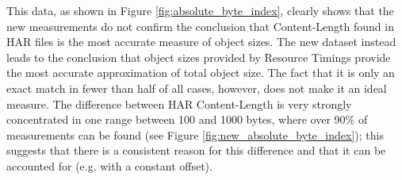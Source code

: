 This data, as shown in Figure \ref{fig:absolute_byte_index}, clearly shows that the new measurements do not confirm the conclusion that Content-Length found in HAR files is the most accurate measure of object sizes. The new dataset instead leads to the conclusion that object sizes provided by Resource Timings provide the most accurate approximation of total object size. The fact that it is only an exact match in fewer than half of all cases, however, does not make it an ideal measure. The difference between HAR Content-Length is very strongly concentrated in one range between 100 and 1000 bytes, where over 90\% of measurements can be found (see Figure \ref{fig:new_absolute_byte_index}); this suggests that there is a consistent reason for this difference and that it can be accounted for (e.g. with a constant offset). 

